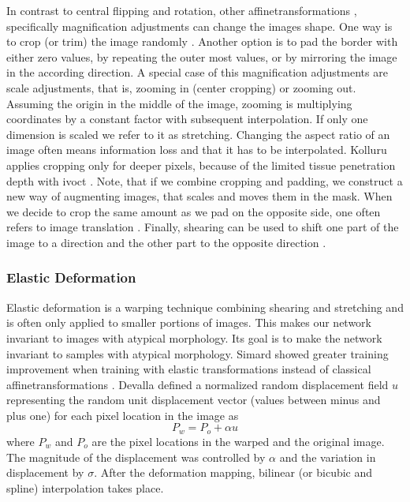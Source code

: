 In contrast to central flipping and rotation, other \glspl{affinetransformation} \cite{Girard.2013}, specifically magnification adjustments \cite{Kuwayama.2019} can change the images shape. One way is to crop (or trim) the image randomly \cite{Gessert.2018}. Another option is to pad the border with either zero values, by repeating the outer most values, or by mirroring the image in the according direction. A special case of this magnification adjustments are scale adjustments, that is, zooming in (center cropping) \cite{BenCohen.2018} or zooming out. Assuming the origin in the middle of the image, zooming is multiplying coordinates by a constant factor with subsequent interpolation. If only one dimension is scaled we refer to it as stretching. Changing the aspect ratio of an image often means information loss and that it has to be interpolated. Kolluru applies cropping only for deeper pixels, because of the limited tissue penetration depth with \acrshort{ivoct} \cite{Kolluru.2018}. Note, that if we combine cropping and padding, we construct a new way of augmenting images, that scales and moves them in the mask. When we decide to crop the same amount as we pad on the opposite side, one often refers to image translation \cite{BenCohen.2018}. Finally, shearing can be used to shift one part of the image to a direction and the other part to the opposite direction \cite{hussain.2018}.

\subsubsection{Elastic Deformation}

Elastic deformation \cite{Devalla.2018, Simard.2003, Wu.2015} is a warping technique combining shearing and stretching and is often only applied to smaller portions of images. This makes our network invariant to images with atypical morphology. Its goal is to make the network invariant to samples with atypical morphology. Simard showed greater training improvement when training with elastic transformations instead of classical \glspl{affinetransformation} \cite{Simard.2003}. Devalla defined a normalized random displacement field \( u \) representing the random unit displacement vector (values between minus and plus one) for each pixel location in the image as
\begin{equation}
P_{w}=P_{o}+\alpha u
\end{equation}
where \( P_w \) and \( P_o \) are the pixel locations in the warped and the original image. The magnitude of the displacement was controlled by \( \alpha \) and the variation in displacement by \( \sigma \). After the deformation mapping, bilinear (or bicubic and spline) interpolation takes place. \cite{Simard.2003}


